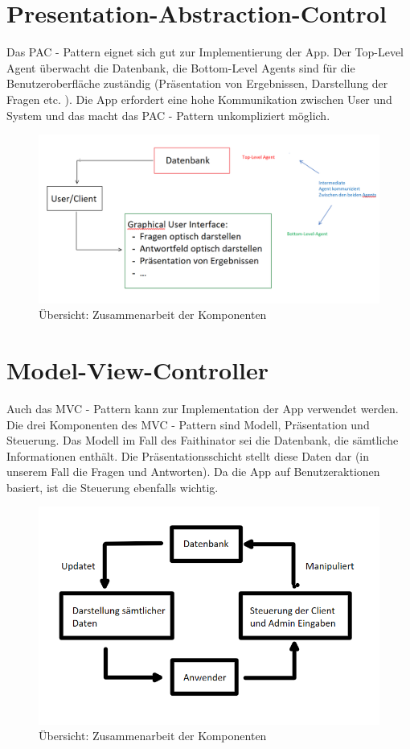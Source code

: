 \documentclass{scrreprt}
\begin{document}
\chapter{Presentation-Abstraction-Control}
Das PAC - Pattern eignet sich gut zur Implementierung der App. Der Top-Level Agent überwacht die Datenbank, die Bottom-Level Agents sind für die Benutzeroberfläche zuständig (Präsentation von Ergebnissen, Darstellung der Fragen etc. ). Die App erfordert eine hohe Kommunikation zwischen User und System und das macht das PAC - Pattern unkompliziert möglich.
\begin{figure}[ht]
 \includegraphics[width=\textwidth]{./pics/PAC.PNG}
 \caption{Übersicht: Zusammenarbeit der Komponenten}
 \label{abb:1}
\end{figure}

\chapter{Model-View-Controller}
Auch das MVC -  Pattern kann zur Implementation der App verwendet werden. Die drei Komponenten des MVC - Pattern sind Modell, Präsentation und Steuerung. Das Modell im Fall des Faithinator sei die Datenbank, die sämtliche Informationen enthält. Die Präsentationsschicht stellt diese Daten dar (in unserem Fall die Fragen und Antworten). Da die App auf Benutzeraktionen basiert, ist die Steuerung ebenfalls wichtig.
\begin{figure}[ht]
 \includegraphics[width=\textwidth]{./pics/MVC.PNG}
 \caption{Übersicht: Zusammenarbeit der Komponenten}
 \label{abb:2}
\end{figure}
\end{document}
